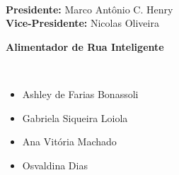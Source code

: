 \begin{titlepage} 
\thispagestyle{estiloCapa}
\begin{center}
 
    \vspace{30pt}
        
	 \\
            \vspace{5pt}
            \textbf{Presidente:} Marco Antônio C. Henry \\
            \textbf{Vice-Presidente:} Nicolas Oliveira \\

    \vspace{15pt}

    
    \vspace{80pt}
            
    \huge{\textbf{Alimentador de Rua Inteligente}} \\
    \vspace{15pt}

    \large{} \\

    \vspace{66pt}

\end{center}

\vspace{80pt}

\begin{itemize}
    \item Ashley de Farias Bonassoli
    \item Gabriela Siqueira Loiola
    \item Ana Vitória Machado
    \item Osvaldina Dias
\end{itemize}

\end{titlepage}
